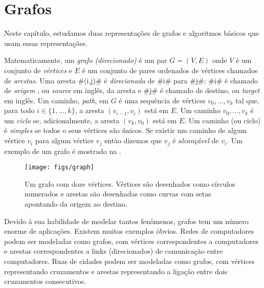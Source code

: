 \chapter{Grafos}


Neste capítulo, estudamos duas representações de grafos e algoritmos
básicos que usam essas representações.

Matematicamente, um \emph{grafo (direcionado)}
%
%
é um par
$G=(V,E)$ onde
$V$ é um conjunto de \emph{vértices}
%
e $E$ é um conjunto de pares ordenados de vértices chamados de 
\emph{arestas}.
%
Uma aresta #(i,j)# é \emph{direcionada}
%
de #i# para #j#;  #i# é chamado de \emph{origem}
, ou \emph{source} em inglês, da aresta e #j#
é chamado de destino, ou \emph{target} em inglês.
  Um caminho, \emph{path},%
 em $G$ é uma sequência de vértices 
$v_0,\ldots,v_k$ tal que, para todo $i\in\{1,\ldots,k\}$,
a aresta $(v_{i-1},v_{i})$ está em $E$.  Um caminho $v_0,\ldots,v_k$ é um
\emph{ciclo}
%
se, adicionalmente, a aresta
 $(v_k,v_0)$ está em $E$.  Um caminho (ou ciclo) é 
\emph{simples}
%
se todos o seus vértices são únicos. Se existir um caminho de algum vértice
$v_i$ para algum vértice $v_j$ então dizemos que 
$v_j$ é \emph{alcançável}
 de $v_i$.  Um exemplo de um grafo é mostrado na 
.

\begin{figure}
  \begin{center}
    \texttt{[image: figs/graph]}
  \end{center}
  \caption{Um grafo com doze vértices. Vértices são desenhados como círculos numerados e arestas são desenhadas como curvas com setas apontando da origem ao destino.}
\end{figure}

Devido à sua habilidade de modelar tantos fenômenos, grafos tem um número enorme de aplicações. Existem muitos exemplos óbvios. Redes de computadores podem
ser modeladas como grafos, com vértices correspondentes a computadores e arestas correspondentes a links (direcionados) de comunicação entre computadores.
Ruas de cidades podem ser modeladas como grafos, com vértices representando cruzamentos e arestas representando a ligação entre dois cruzamentos consecutivos.

